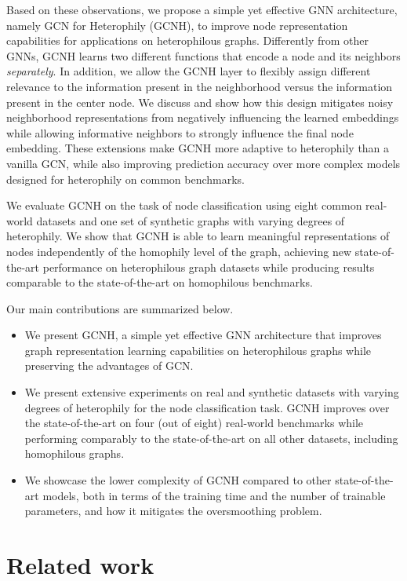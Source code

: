 \documentclass[conference]{IEEEtran}
\begin{document}
Based on these observations, we propose a simple yet effective GNN architecture, namely GCN for Heterophily (GCNH), to improve node representation capabilities for applications on heterophilous graphs.
Differently from other GNNs, GCNH learns two different functions that encode a node and its neighbors \textit{separately}.
In addition, we allow the GCNH layer to flexibly assign different relevance to the information present in the neighborhood versus the information present in the center node.
We discuss and show how this design mitigates noisy neighborhood representations from negatively influencing the learned embeddings while allowing informative neighbors to strongly influence the final node embedding.
These extensions make GCNH more adaptive to heterophily than a vanilla GCN, while also improving prediction accuracy over more complex models designed for heterophily on common benchmarks.

We evaluate GCNH on the task of node classification using eight common real-world datasets and one set of synthetic graphs with varying degrees of heterophily.
We show that GCNH is able to learn meaningful representations of nodes independently of the homophily level of the graph, achieving new state-of-the-art performance on heterophilous graph datasets while producing results comparable to the state-of-the-art on homophilous benchmarks.

Our main contributions are summarized below.
\begin{itemize}
    \item We present GCNH, a simple yet effective GNN architecture that improves graph representation learning capabilities on heterophilous graphs while preserving the advantages of GCN.
    \item We present extensive experiments on real and synthetic datasets with varying degrees of heterophily for the node classification task. GCNH improves over the state-of-the-art on four (out of eight) real-world benchmarks while performing comparably to the state-of-the-art on all other datasets, including homophilous graphs.
    \item We showcase the lower complexity of GCNH compared to other state-of-the-art models, both in terms of the training time and the number of trainable parameters, and how it mitigates the oversmoothing problem.
\end{itemize}



\section{Related work}
\end{document}
